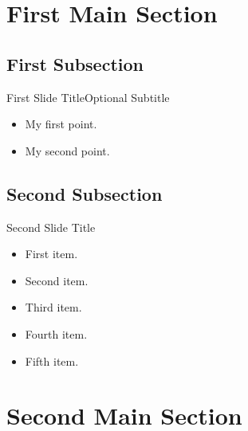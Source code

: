 \documentclass{beamer}
\begin{document}
\section{First Main Section}

\subsection{First Subsection}

\begin{frame}{First Slide Title}{Optional Subtitle}
    \begin{itemize}
        \item {
                My first point.
            }
        \item {
                My second point.
            }
    \end{itemize}
\end{frame}

\subsection{Second Subsection}

\begin{frame}{Second Slide Title}
    \begin{itemize}
        \item {
                First item.
                \pause %
            }
        \item {   
                Second item.
            }
        \item<3-> {
                Third item.
            }
        \item<4-> {
                Fourth item.
            }
        \item<5-> {
                Fifth item. 
            }
    \end{itemize}
\end{frame}

\section{Second Main Section}
\end{document}
